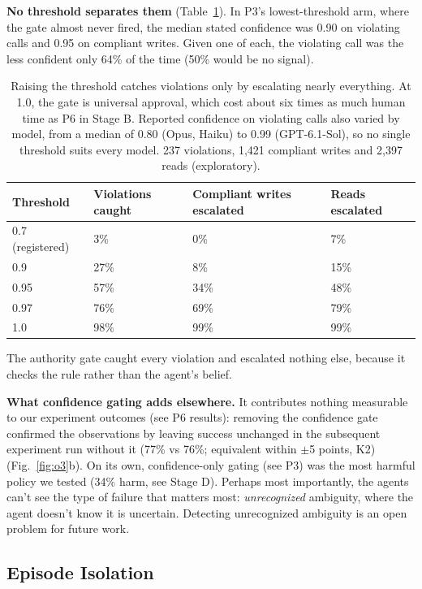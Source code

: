 \documentclass[letterpaper,twocolumn,10pt]{article}
\begin{document}
\textbf{No threshold separates them} (Table~\ref{tab:o3}). In P3's lowest-threshold arm, where the gate almost never fired, the median stated confidence was 0.90 on violating calls and 0.95 on compliant writes. Given one of each, the violating call was the less confident only 64\% of the time (50\% would be no signal).

\begin{table}[t]
\centering
\footnotesize
\begin{tabularx}{\columnwidth}{lXXX}
\toprule
\textbf{Threshold} & \textbf{Violations caught} & \textbf{Compliant writes escalated} & \textbf{Reads escalated} \\
\midrule
0.7 (registered) & 3\% & 0\% & 7\% \\
0.9 & 27\% & 8\% & 15\% \\
0.95 & 57\% & 34\% & 48\% \\
0.97 & 76\% & 69\% & 79\% \\
1.0 & 98\% & 99\% & 99\% \\
\bottomrule
\end{tabularx}
\caption{Raising the threshold catches violations only by escalating nearly everything. At 1.0, the gate is universal approval, which cost about six times as much human time as P6 in Stage B. Reported confidence on violating calls also varied by model, from a median of 0.80 (Opus, Haiku) to 0.99 (GPT-6.1-Sol), so no single threshold suits every model. 237 violations, 1,421 compliant writes and 2,397 reads (exploratory).}\label{tab:o3}
\end{table}

The authority gate caught every violation and escalated nothing else, because it checks the rule rather than the agent's belief.

\textbf{What confidence gating adds elsewhere.} It contributes nothing measurable to our experiment outcomes (see P6 results): removing the confidence gate confirmed the observations by leaving success unchanged in the subsequent experiment run without it (77\% vs 76\%; equivalent within $\pm$5 points, K2) (Fig.~\ref{fig:o3}b). On its own, confidence-only gating (see P3) was the most harmful policy we tested (34\% harm, see Stage D). Perhaps most importantly, the agents can't see the type of failure that matters most: \emph{unrecognized} ambiguity, where the agent doesn't know it is uncertain. Detecting unrecognized ambiguity is an open problem for future work.

\subsection{Episode Isolation}\label{sec:4.8}
\end{document}
